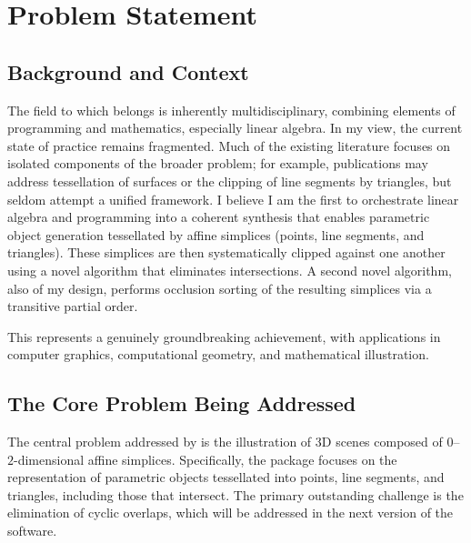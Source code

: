 \chapter{Problem Statement}

\section{Background and Context}

The field to which \luatikztdtools{} belongs is inherently
multidisciplinary, combining elements of programming and
mathematics, especially linear algebra. In my view, the current
state of practice remains fragmented. Much of the existing
literature focuses on isolated components of the broader problem;
for example, publications may address tessellation of surfaces or
the clipping of line segments by triangles, but seldom attempt a
unified framework. I believe I am the first to orchestrate linear
algebra and programming into a coherent synthesis that enables
parametric object generation tessellated by affine simplices
(points, line segments, and triangles). These simplices are then
systematically clipped against one another using a novel algorithm
that eliminates intersections. A second novel algorithm, also of
my design, performs occlusion sorting of the resulting simplices
via a transitive partial order.

This represents a genuinely groundbreaking achievement, with
applications in computer graphics, computational geometry, and
mathematical illustration.

\section{The Core Problem Being Addressed}

The central problem addressed by \luatikztdtools{} is the
illustration of \(3\)D scenes composed of \(0\)--\(2\)-dimensional
affine simplices. Specifically, the package focuses on the
representation of parametric objects tessellated into points,
line segments, and triangles, including those that intersect.
The primary outstanding challenge is the elimination of cyclic
overlaps, which will be addressed in the next version of the
software.

